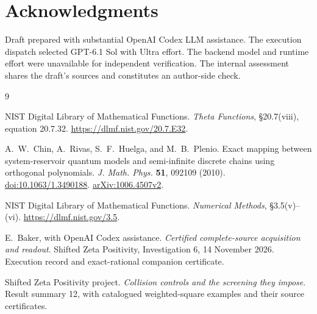 \documentclass[11pt]{article}
\numberwithin{equation}{section}
\begin{document}
\section*{Acknowledgments}

Draft prepared with substantial OpenAI Codex LLM assistance.
The execution dispatch selected GPT-6.1 Sol with Ultra effort.
The backend model and runtime effort were unavailable for
independent verification. The internal assessment shares the
draft's sources and constitutes an author-side check.

\begin{thebibliography}{9}

NIST Digital Library of Mathematical Functions.
\emph{Theta Functions}, \S20.7(viii), equation 20.7.32.
\url{https://dlmf.nist.gov/20.7.E32}.

A.~W.~Chin, A.~Rivas, S.~F.~Huelga, and M.~B.~Plenio.
Exact mapping between system-reservoir quantum models and
semi-infinite discrete chains using orthogonal polynomials.
\emph{J. Math. Phys.} \textbf{51}, 092109 (2010).
\href{https://doi.org/10.1063/1.3490188}{doi:10.1063/1.3490188}.
\href{https://arxiv.org/abs/1006.4507v2}{arXiv:1006.4507v2}.

NIST Digital Library of Mathematical Functions.
\emph{Numerical Methods}, \S3.5(v)--(vi).
\url{https://dlmf.nist.gov/3.5}.

E.~Baker, with OpenAI Codex assistance.
\emph{Certified complete-source acquisition and readout}.
Shifted Zeta Positivity, Investigation 6, 14 November 2026.
Execution record and exact-rational companion certificate.

Shifted Zeta Positivity project.
\emph{Collision controls and the screening they impose}.
Result summary 12, with catalogued weighted-square examples and
their source certificates.

\end{thebibliography}
\end{document}
